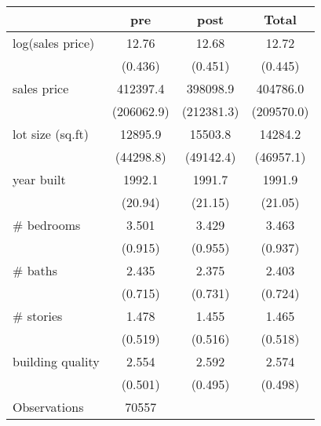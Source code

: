 \begin{tabular}{l*{3}{c}}
\hline\hline
                    &         pre&        post&       Total\\
\hline
log(sales price)    &       12.76&       12.68&       12.72\\
                    &     (0.436)&     (0.451)&     (0.445)\\
[1em]
sales price         &    412397.4&    398098.9&    404786.0\\
                    &  (206062.9)&  (212381.3)&  (209570.0)\\
[1em]
lot size (sq.ft)    &     12895.9&     15503.8&     14284.2\\
                    &   (44298.8)&   (49142.4)&   (46957.1)\\
[1em]
year built          &      1992.1&      1991.7&      1991.9\\
                    &     (20.94)&     (21.15)&     (21.05)\\
[1em]
\# bedrooms         &       3.501&       3.429&       3.463\\
                    &     (0.915)&     (0.955)&     (0.937)\\
[1em]
\# baths            &       2.435&       2.375&       2.403\\
                    &     (0.715)&     (0.731)&     (0.724)\\
[1em]
\# stories          &       1.478&       1.455&       1.465\\
                    &     (0.519)&     (0.516)&     (0.518)\\
[1em]
building quality    &       2.554&       2.592&       2.574\\
                    &     (0.501)&     (0.495)&     (0.498)\\
\hline
Observations        &       70557&            &            \\
\hline\hline
\end{tabular}
